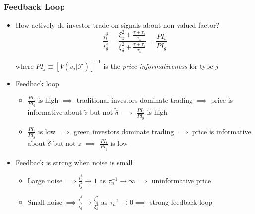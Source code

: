 \documentclass{beamer}
\begin{document}
\begin{frame}
\frametitle{Feedback Loop}
\begin{itemize}[<+->]
\item How actively do investor trade on signals about non-valued factor?
$$
\frac{i_t^\delta}{i_g^z} = \frac{\xi_z^2 + \frac{\tau + \tau_s}{\tau_n}}{\xi_\delta^2 + \frac{\tau + \tau_s}{\tau_n}} = \frac{PI_t}{PI_g}
$$

where $PI_j \equiv [V(\tilde v_j | \mathcal{F})]^{-1}$ is the \textit{price informativeness} for type $j$

\bigskip

\item Feedback loop

\begin{itemize}[<+->]

\item $\frac{PI_t}{PI_g}$ is high $\implies$ traditional investors dominate trading $\implies$ price is informative about $\tilde z$ but not $\tilde \delta$ $\implies$ $\frac{PI_t}{PI_g}$ is high
\item $\frac{PI_t}{PI_g}$ is low $\implies$ green investors dominate trading $\implies$ price is informative about $\tilde \delta$ but not $\tilde z$ $\implies$ $\frac{PI_t}{PI_g}$ is low

\end{itemize}

\bigskip

\item Feedback is strong when noise is small

\begin{itemize}[<+->]

\item Large noise $\implies \frac{i_t^\delta}{i_g^z}\to 1$ as $\tau_n^{-1} \to \infty \implies$ uninformative price 

\item Small noise $\implies \frac{i_t^\delta}{i_g^z}\to \frac{\xi_z^2}{\xi_\delta^2}$ as $\tau_n^{-1} \to 0 \implies$ strong feedback loop

\end{itemize}

\end{itemize}
\end{frame}
\end{document}
